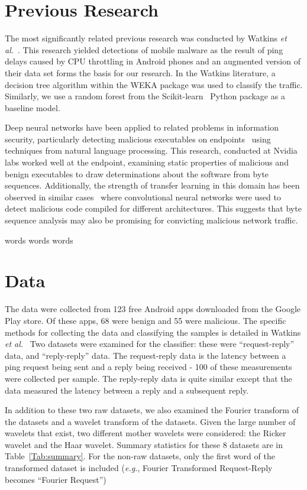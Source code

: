 \documentclass[10pt]{article}
\begin{document}
\section{Previous Research}
The most significantly related previous research was conducted by Watkins \textit{et al.}~\cite{watkins2018network}.
This research yielded detections of mobile malware as the result of ping delays caused by CPU throttling in Android phones and an augmented version of their data set forms the basis for our research.
In the Watkins literature, a decision tree algorithm within the WEKA package was used to classify the traffic.
Similarly, we use a random forest from the Scikit-learn~\cite{scikit-learn} Python package as a baseline model.

Deep neural networks have been applied to related problems in information security, particularly detecting malicious executables on endpoints~\cite{raff2018malware} using techniques from natural language processing.
This research, conducted at Nvidia labs worked well at the endpoint, examining static properties of malicious and benign executables to draw determinations about the software from byte sequences.
Additionally, the strength of transfer learning in this domain has been observed in similar cases~\cite{galinkin2019shape} where convolutional neural networks were used to detect malicious code compiled for different architectures.
This suggests that byte sequence analysis may also be promising for convicting malicious network traffic.

words words words 

\section{Data}
The data were collected from 123 free Android apps downloaded from the Google Play store. 
Of these apps, 68 were benign and 55 were malicious.
The specific methods for collecting the data and classifying the samples is detailed in Watkins \textit{et al.}~\cite{watkins2018network}
Two datasets were examined for the classifier: these were ``request-reply'' data, and ``reply-reply'' data.
The request-reply data is the latency between a ping request being sent and a reply being received - 100 of these measurements were collected per sample.
The reply-reply data is quite similar except that the data measured the latency between a reply and a subsequent reply.

In addition to these two raw datasets, we also examined the Fourier transform of the datasets and a wavelet transform of the datasets. 
Given the large number of wavelets that exist, two different mother wavelets were considered: the Ricker wavelet and the Haar wavelet.
Summary statistics for these 8 datasets are in Table~\ref{Tab:summary}. 
For the non-raw datasets, only the first word of the transformed dataset is included (\textit{e.g.}, Fourier Transformed Request-Reply becomes ``Fourier Request'')
\end{document}
